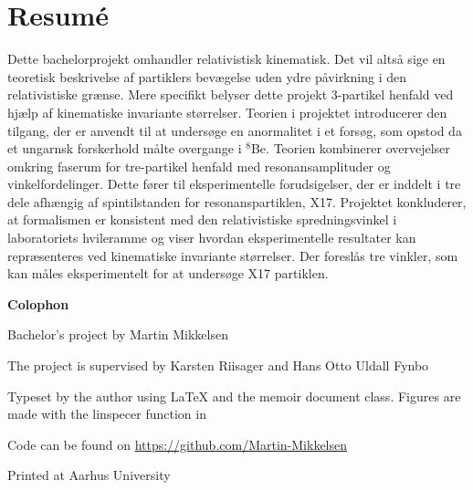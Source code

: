 \section*{Resumé}
Dette bachelorprojekt omhandler relativistisk kinematisk. Det vil altså sige en teoretisk beskrivelse af partiklers bevægelse uden ydre påvirkning i den relativistiske grænse. Mere specifikt belyser dette projekt 3-partikel henfald ved hjælp af kinematiske invariante størrelser. Teorien i projektet introducerer den tilgang, der er anvendt til at undersøge en anormalitet i et forsøg, som opstod da et ungarnsk forskerhold målte overgange i $^8$Be. Teorien kombinerer overvejelser omkring faserum for tre-partikel henfald med resonansamplituder og vinkelfordelinger. Dette fører til eksperimentelle forudsigelser, der er inddelt i tre dele afhængig af spintilstanden for resonanspartiklen, X17. Projektet konkluderer, at formalismen er konsistent med den relativistiske spredningsvinkel i laboratoriets hvileramme og viser hvordan eksperimentelle resultater kan repræsenteres ved kinematiske invariante størrelser. Der foreslås tre vinkler, som kan måles eksperimentelt for at undersøge X17 partiklen.
\newpage



\makeatletter
\edef\fontandleading{\@memptsize.0/\the\baselineskip}
\makeatother
\thispagestyle{empty}
\strut\vfill
{
	\setlength{\parindent}{0pt}
	\addtolength{\parskip}{.6em}
	
	\begin{center}
		\bfseries\sffamily Colophon
	\end{center}
	
	\small
	
	\textsl{\projecttitle}
	
	\smallskip
	
	Bachelor's project by Martin Mikkelsen
	
	The project is supervised by Karsten Riisager and Hans Otto Uldall Fynbo
	
	Typeset by the author using \LaTeX{} and the \textsf{memoir} document class. Figures are made with the linspecer function in \MATLAB
	
	Code can be found on \url{https://github.com/Martin-Mikkelsen}
	
	Printed at Aarhus University
}

